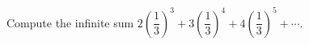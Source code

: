 Compute the infinite sum $2\left(\dfrac13\right)^3+3\left(\dfrac13\right)^4+4\left(\dfrac13\right)^5+\cdots$.
